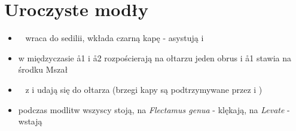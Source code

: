 \section{Uroczyste modły}

    \begin{itemize}
        \item \ii~ wraca do sedilii, wkłada czarną kapę - asystują  i 
        \item w międzyczasie \aa1 i \aa2 rozpościerają na ołtarzu jeden obrus i \aa1 stawia na środku Mszał
        \item \ii~ z  i  udają się do ołtarza (brzegi kapy są podtrzymywane przez  i )
        \item podczas modlitw wszyscy stoją, na \textit{Flectamus genua} - klękają, na \textit{Levate} - wstają
    \end{itemize}
    
    

